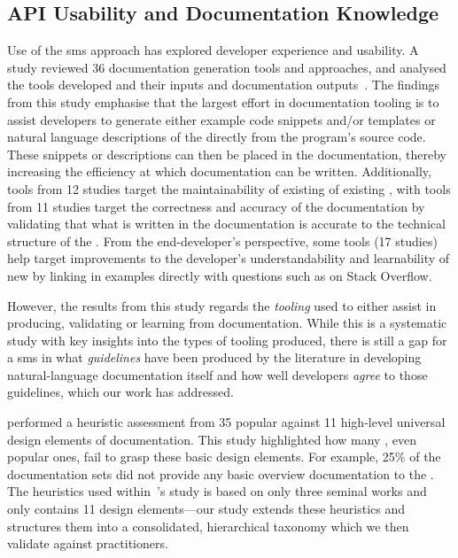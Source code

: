 \subsection{API Usability and Documentation Knowledge}

Use of the \gls{sms} approach has explored developer experience and  usability. A~\citeyear{Nybom:2018ef} study reviewed 36  documentation generation tools and approaches, and analysed the tools developed and their inputs and documentation outputs~\citep{Nybom:2018ef}. The findings from this study emphasise that the largest effort in  documentation tooling is to assist developers to generate either example code snippets and/or templates or natural language descriptions of the  directly from the program's source code. These snippets or descriptions can then be placed in the  documentation, thereby increasing the efficiency at which  documentation can be written. Additionally, tools from 12 studies target the maintainability of existing  of existing , with tools from 11 studies target the correctness and accuracy of the documentation by validating that what is written in the documentation is accurate to the technical structure of the . From the end-developer's perspective, some tools (17 studies) help target improvements to the developer's understandability and learnability of new  by linking in examples directly with questions such as on Stack Overflow.

However, the results from this study regards the \textit{tooling} used to either assist in producing, validating or learning from  documentation. While this is a systematic study with key insights into the types of tooling produced, there is still a gap for a \gls{sms} in what \textit{guidelines} have been produced by the literature in developing natural-language documentation itself and how well developers \textit{agree} to those guidelines, which our work has addressed.

\citet{Watson:2012uy} performed a heuristic assessment from 35 popular  against 11 high-level universal design elements of  documentation. This study highlighted how many , even popular ones, fail to grasp these basic design elements. For example, 25\% of the documentation sets did not provide any basic overview documentation to the . The heuristics used within~\citeauthor{Watson:2012uy}'s study is based on only three seminal works and only contains 11 design elements---our study extends these heuristics and structures them into a consolidated, hierarchical taxonomy which we then validate against practitioners.

